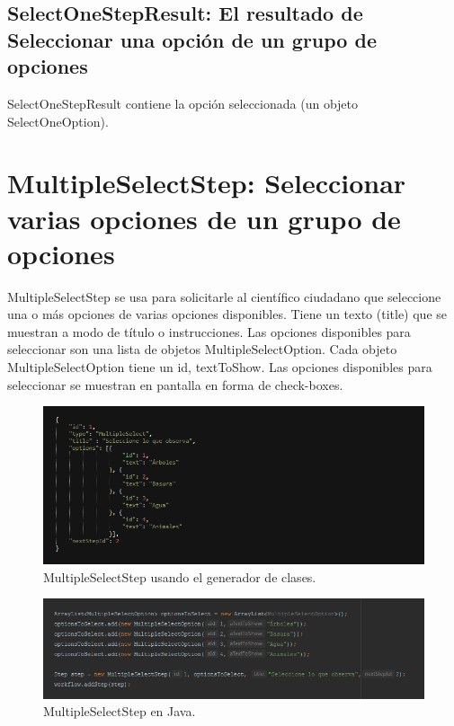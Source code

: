 \subsection{SelectOneStepResult: El resultado de Seleccionar una opción de un grupo de opciones}
SelectOneStepResult contiene la opción seleccionada (un objeto SelectOneOption).





\section{MultipleSelectStep: Seleccionar varias opciones de un grupo de opciones}
MultipleSelectStep  se usa para solicitarle al científico ciudadano que seleccione una o más opciones de varias opciones disponibles. Tiene un texto (title) que se muestran a modo de título o instrucciones. Las opciones disponibles para seleccionar son una lista de objetos MultipleSelectOption.
Cada objeto MultipleSelectOption tiene un id, textToShow.
Las opciones disponibles para seleccionar se muestran en pantalla en forma de check-boxes.


\begin{figure}[H]
  \centering
    \includegraphics[scale=0.6]{50-anexos/C-steps/multiple_select_json.png} 
    \caption{MultipleSelectStep usando el generador de clases.}
\end{figure}	

\begin{figure}[H]
  \centering
    \includegraphics[scale=0.6]{50-anexos/C-steps/multiple_select_java.png} 
    \caption{MultipleSelectStep en Java.}
\end{figure}


